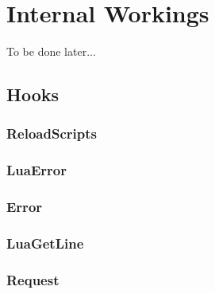 \documentclass[a4paper,11pt]{report}
\begin{document}
\chapter{Internal Workings}
To be done later...

\section{Hooks}
\subsection{ReloadScripts}
\subsection{LuaError}
\subsection{Error}
\subsection{LuaGetLine}
\subsection{Request}
\end{document}
